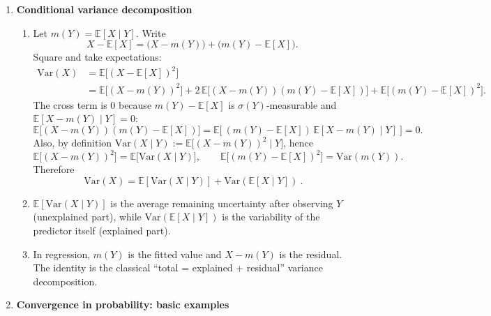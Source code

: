 \documentclass[11pt]{article}
\begin{document}
\begin{enumerate}
\begin{enumerate}
\item Equality $\mathbb{E}[X\mid Y]=\mathbb{E}[X]$ only says $Y$ carries no \emph{linear/mean} predictive information about $X$.
Independence is stronger: it requires factorization of the whole joint law.
\end{enumerate}

\bigskip

\item \textbf{Conditional variance decomposition}

\begin{enumerate}
\item Let $m(Y)=\mathbb{E}[X\mid Y]$. Write
\[
X-\mathbb{E}[X] = \big(X-m(Y)\big) + \big(m(Y)-\mathbb{E}[X]\big).
\]
Square and take expectations:
\begin{align*}
\mathrm{Var}(X)
&=\mathbb{E}\big[(X-\mathbb{E}[X])^2\big]\\
&=\mathbb{E}\big[(X-m(Y))^2\big]
+2\,\mathbb{E}\big[(X-m(Y))(m(Y)-\mathbb{E}[X])\big]
+\mathbb{E}\big[(m(Y)-\mathbb{E}[X])^2\big].
\end{align*}
The cross term is $0$ because $m(Y)-\mathbb{E}[X]$ is $\sigma(Y)$-measurable and
$\mathbb{E}[X-m(Y)\mid Y]=0$:
\[
\mathbb{E}\big[(X-m(Y))(m(Y)-\mathbb{E}[X])\big]
=\mathbb{E}\Big[\ (m(Y)-\mathbb{E}[X])\,\mathbb{E}[X-m(Y)\mid Y]\ \Big]=0.
\]
Also, by definition $\mathrm{Var}(X\mid Y):=\mathbb{E}\big[(X-m(Y))^2\mid Y\big]$, hence
\[
\mathbb{E}\big[(X-m(Y))^2\big]=\mathbb{E}\big[\mathrm{Var}(X\mid Y)\big],
\qquad
\mathbb{E}\big[(m(Y)-\mathbb{E}[X])^2\big]=\mathrm{Var}(m(Y)).
\]
Therefore
\[
\boxed{\ \mathrm{Var}(X)=\mathbb{E}[\mathrm{Var}(X\mid Y)] + \mathrm{Var}(\mathbb{E}[X\mid Y])\ }.
\]

\item $\mathbb{E}[\mathrm{Var}(X\mid Y)]$ is the average remaining uncertainty after observing $Y$ (unexplained part),
while $\mathrm{Var}(\mathbb{E}[X\mid Y])$ is the variability of the predictor itself (explained part).

\item In regression, $m(Y)$ is the fitted value and $X-m(Y)$ is the residual. The identity is the classical
``total = explained + residual'' variance decomposition.
\end{enumerate}

\bigskip

\item \textbf{Convergence in probability: basic examples}


\end{enumerate}
\end{document}
